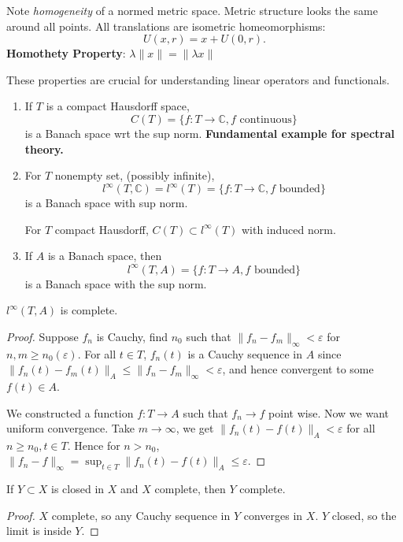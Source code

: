 \begin{remark}
	Note \textit{homogeneity} of a normed metric space. Metric structure looks the same around all points. All translations are isometric homeomorphisms:
	\[
		U(x, r) = x + U(0, r)
	.\] 
	\textbf{Homothety Property}: $\lambda \| x\| = \| \lambda x\|$
\end{remark}

These properties are crucial for understanding linear operators and functionals. 

\begin{example}
	\begin{enumerate}
		\item If $T$ is a compact Hausdorff space, 
			\[
				C(T) = \{f: T \to \mathbb{C}, f \text{ continuous}\} 
			\] 
			is a Banach space wrt the sup norm. \textbf{Fundamental example for spectral theory.}
		\item For $T$ nonempty set, (possibly infinite),
			\[
				l^{\infty } (T, \mathbb{C}) = l^{\infty }(T) = \{f: T \to  \mathbb{C} , f \text{ bounded}\} 
			\] 
			is a Banach space with sup norm. 

			For $T$ compact Hausdorff, $C(T) \subset l^{\infty }(T)$ with induced norm.
		\item If $A$ is a Banach space, then
			\[
				l^{\infty }(T, A) = \{ f: T \to  A, f \text{ bounded}\} 
			\] 
			is a Banach space with the sup norm.
	\end{enumerate}
\end{example}

\begin{proposition}
	\label{prop:FunctionalSpaceIsComplete}
	$l^\infty (T, A)$ is complete.
\end{proposition}
\begin{proof}
	Suppose $f_n$ is Cauchy, find $n_0$ such that $\|f_n - f_m\|_\infty  < \varepsilon $ for $n, m \ge  n_0(\varepsilon)$. For all $t \in  T$, $f_n(t)$ is a Cauchy sequence in $A$ since $\|f_n(t) - f_m(t)\|_A \le  \|f_n - f_m\|_\infty < \varepsilon $, and hence convergent to some $f(t) \in A$. 

	We constructed a function $f: T \to A$ such that $f_n \to  f$ point wise. Now we want uniform convergence. 
	Take $m \to  \infty $, we get $\| f_n(t) - f(t)\|_A < \varepsilon$ for all $n \ge  n_0, t \in T$. Hence for $n > n_0$,
	$\|f_n - f\|_\infty = \sup _{t \in T} \|f_n(t) - f(t)\|_A \le \varepsilon
	.$ 
\end{proof}

\begin{proposition}
	\label{prop:InducedCompleteness}
	If $Y \subset X$  is closed in $X$ and $X$ complete, then $Y$ complete.
\end{proposition}
\begin{proof}
	$X$ complete, so any Cauchy sequence in $Y$ converges in $X$. $Y$ closed, so the limit is inside $Y$.
\end{proof}

